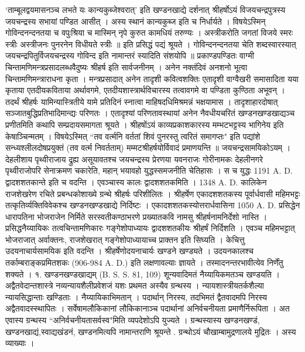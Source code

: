 `ताम्बूलद्वयमासनञ्च लभते यः कान्यकुब्जेश्वरात्' इति खण्डनखाद्ये दर्शनात् श्रीहर्षोऽयं विजयचन्द्रपुत्रस्य जयचन्द्रस्य सभायां पण्डित आसीत् । अस्य स्थानं कान्यकुब्ज इति च निर्धार्यते । विषयेऽस्मिन् 
गोविन्दनन्दनतया च वपुःश्रिया च
मास्मिन् नृपे कुरुत कामधियं तरुण्यः ।
अस्त्रीकरोति जगतां विजये स्मरः
स्त्रीः अस्त्रीजनः पुनरनेन विधीयते स्त्रीः ॥
इति प्रसिद्धं पद्यं श्रूयते । गोविन्दनन्दनतया चेति शब्दस्वारस्यात् जयचन्द्रपितुर्विजयचन्द्रस्य गोविन्द इति नामान्तरं स्यादिति संशयोपि ॥
प्रकाण्डपण्डितः वाग्मी चिन्तामणिमन्त्रप्रसादलब्धवैदुष्यः श्रीहर्ष इति सार्वजनीनम् । अनेन नक्तंदिवं अनशनो भूत्वा चिन्तामणिमन्त्राराधना कृता । मन्त्रप्रसादात् अनेन तादृशी कवित्वशक्तिः एतादृशी वाग्वैखरी समासादिता यया कृताया एतदीयकविताया अर्थावगमे, एतदीयशास्त्रार्थविचारस्य तत्वावगमे वा पण्डिता कुण्ठिता अभूवन् । तदर्थं श्रीहर्षः यामिन्यास्त्रितीये यामे प्रतिदिनं स्नात्वा माहिषदधिमिश्रमन्नं भक्षयामास । तादृशाहारदोषात् सञ्जातबुद्धिप्रतिभादिमान्द्यः परिणतः । एतादृश्यां परिणतावस्थायां अनेन नैवधीयचरितं खण्डनखण्डखाद्यञ्च प्रणीतमिति कथापि सम्प्रदायसमागता श्रूयते ।
श्रीहषोंऽयं काव्यप्रकाशकारस्य मम्भटभट्टस्य भागिनेय इति केषाञ्चिन्मतम् । विषयेऽस्मित् ``तव वर्त्मनि वर्ततां शिवं पुनरस्तु त्वरितं समागप्तः" इति पद्यांशे सन्ध्यश्लीलदोषप्रयुक्तं (तव वर्त्म निवर्तताम्) मम्मटश्रीहर्षयोर्विवादं प्रमाणयन्ति ॥
जयचन्द्रसामयिकोऽयम् । देहलीशाय पृथ्वीराजाय द्रुह्य असूयावतश्च जयचन्द्रस्य प्रेरणया यवनराजः गोरीनामकः देहलीनगरे पृथ्वीराजोपरि सेनाक्रमण चकारेति, महान् भयावहो युद्धस्समजनीति चेतिहासः । स च युद्धः 1191 A. D. द्वादशशतकान्ते इति च वदन्ति । एवञ्चास्य कालः द्वादशशतकमिति ।
1348 A. D. कालिकेन राजशेखरेण रचिते प्रबन्धकोशाख्ये ग्रन्थे श्रीहर्षः परिशीलितः । श्रीहर्षेण एकादशशतकस्य पूर्वार्धवासी महिमभट्टः तत्कृतिर्व्यक्तिविवेकश्च खण्डनखण्डखाद्ये निर्दिष्टः । एकादशशतकस्योत्तरार्धवासिना 1050 A. D. प्रसिद्धेन धारापतिना भोजराजेन निर्मिते सरस्वतीकण्ठाभरणे प्रख्यातकवि नामसु श्रीहर्षनामनिर्देशो नास्ति । प्रसिद्धनैय्यायिकः तत्वचिन्तामणिकारः गङ्गेशोपाध्यायः द्वादशशतकीयः श्रीहर्षं निर्दिशति । एवञ्च महिमभट्टात् भोजराजात् अर्वाक्तनः, राजशेखरात् गङ्गेशोपाध्यायाच्च प्राक्तन इति सिघ्यति ।
केचित्तु उदयनाचार्यसामयिक इति वदन्ति । श्रीहर्षेणोदयनाचार्यः खण्डने खण्ड्यते । उदयनकालश्च तर्काम्बराङ्कप्रमितशकः (906-984 A. D.) इति लक्षणावल्याः ज्ञायते । तस्मादनन्तरभावीत्येव निर्णेंतु शक्यते ।
१. खण्डनखण्डखाद्यम् (B. S. S. 81, 109)
शून्यवादिमतं नैय्यायिकमतञ्च खण्डयति । अद्वैतवेदान्तशास्त्रे नव्यन्यायशैलीप्रवेशजं यशः प्रथमत अस्यैव ग्रन्थस्य । न्यायशास्त्रीयतर्कशैल्या न्यायसिद्धान्ताः खण्डिताः । नैय्यायिकाभिमतान् । पदार्थान् निरस्य, तदभिमतं द्वैतवादमपि निरस्य अद्वैतवादस्स्थापितः । सर्वेषामलौकिकानां लौकिकानाञ्च पदार्थानां अनिर्वचनीयता प्रमाणैर्निरूपिता । अत एवास्य ग्रन्थस्य ``अनिर्वचनीयतासर्वस्व"मिति व्यपदेशोऽपि युज्यते । ग्रन्थस्यास्य खण्डनखण्डं, खण्डनखाद्यं,स्वाद्यखंडनं, खण्डनमित्यपि नामान्तराणि श्रूयन्ते . ग्रन्थोऽयं चौखाम्बामुद्रणालये मुद्रितः । अस्य व्याख्याः ।
